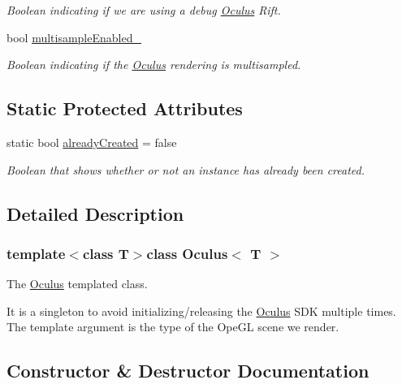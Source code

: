 \begin{DoxyCompactItemize}
\begin{DoxyCompactList}\small\item\em Boolean indicating if we are using a debug \hyperlink{classOculus}{Oculus} Rift. \end{DoxyCompactList}\item 
bool \hyperlink{classOculus_a526eb65105ddf30005f1a14fd9325e6c}{multisample\+Enabled\+\_\+}
\begin{DoxyCompactList}\small\item\em Boolean indicating if the \hyperlink{classOculus}{Oculus} rendering is multisampled. \end{DoxyCompactList}\end{DoxyCompactItemize}
\subsection*{Static Protected Attributes}
\begin{DoxyCompactItemize}
\item 
static bool \hyperlink{classOculus_a56f59153d62ca8802b7573abd6059967}{already\+Created} = false
\begin{DoxyCompactList}\small\item\em Boolean that shows whether or not an instance has already been created. \end{DoxyCompactList}\end{DoxyCompactItemize}


\subsection{Detailed Description}
\subsubsection*{template$<$class T$>$class Oculus$<$ T $>$}

The \hyperlink{classOculus}{Oculus} templated class. 

It is a singleton to avoid initializing/releasing the \hyperlink{classOculus}{Oculus} S\+D\+K multiple times. The template argument is the type of the Ope\+G\+L scene we render. 

\subsection{Constructor \& Destructor Documentation}
\hypertarget{classOculus_a4991461c1a276365ffc8ac9ea8a14451}{}
